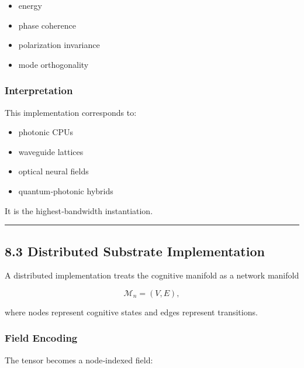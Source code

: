 \begin{itemize}
\tightlist
\item
  energy\\
\item
  phase coherence\\
\item
  polarization invariance\\
\item
  mode orthogonality
\end{itemize}

\subsubsection{Interpretation}\label{interpretation-1}

This implementation corresponds to:

\begin{itemize}
\tightlist
\item
  photonic CPUs\\
\item
  waveguide lattices\\
\item
  optical neural fields\\
\item
  quantum‑photonic hybrids
\end{itemize}

It is the highest‑bandwidth instantiation.

\begin{center}\rule{0.5\linewidth}{0.5pt}\end{center}

\subsection{8.3 Distributed Substrate Implementation}\label{distributed-substrate-implementation}

A distributed implementation treats the cognitive manifold as a network manifold

\[
\mathcal{M}_n = (V, E),
\]

where nodes represent cognitive states and edges represent transitions.

\subsubsection{Field Encoding}\label{field-encoding-1}

The tensor becomes a node‑indexed field:

